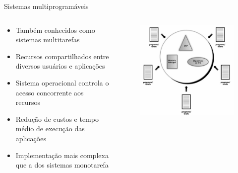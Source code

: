 \documentclass[aspectratio=169,
				xcolor=table]{beamer}
\begin{document}
	\begin{frame}{Sistemas multiprogramáveis}
		\begin{columns}
			\begin{column}{0.5\textwidth}
				\begin{itemize}
					\item Também conhecidos como sistemas multitarefas
					\vspace{0.8em}
					\item Recursos compartilhados entre diversos usuários e aplicações
					\vspace{0.8em}
					\item Sistema operacional controla o acesso concorrente aos recursos
					\vspace{0.8em}
					\item Redução de custos e tempo médio de execução das aplicações
					\vspace{0.8em}
					\item Implementação mais complexa que a dos sistemas monotarefa
				\end{itemize}
			\end{column}
			\begin{column}{0.5\textwidth}			
				\begin{figure}[hbtp]
					\centering
					\includegraphics[width=.85\textwidth, keepaspectratio]{../figs/cap01/multitarefa.png}
				\end{figure}
			\end{column}
		\end{columns}
	\end{frame}
	
\end{document}
